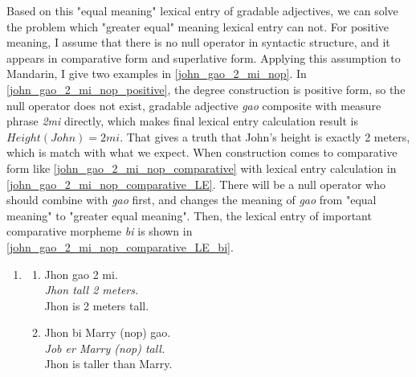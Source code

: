 \documentclass{ctexart}
\begin{document}
Based on this "equal meaning" lexical entry of gradable adjectives, we can solve the problem which "greater equal" meaning lexical entry can not. For positive meaning, I assume that there is no null operator in syntactic structure, and it appears in comparative form and superlative form. Applying this assumption to Mandarin, I give two examples in \ref{john_gao_2_mi_nop}. In \ref{john_gao_2_mi_nop_positive}, the degree construction is positive form, so the null operator does not exist, gradable adjective \textit{gao} composite with measure phrase \textit{2mi} directly, which makes final lexical entry calculation result is $Height(John)=2mi$. That gives a truth that John's height is exactly 2 meters, which is match with what we expect. When construction comes to comparative form like \ref{john_gao_2_mi_nop_comparative} with lexical entry calculation in \ref{john_gao_2_mi_nop_comparative_LE}. There will be a null operator who should combine with \textit{gao} first, and changes the meaning of \textit{gao} from "equal meaning" to "greater equal meaning". Then, the lexical entry of important comparative morpheme \textit{bi} is shown in \ref{john_gao_2_mi_nop_comparative_LE_bi}.

\begin{enumerate}[resume]
    \item \label{john_gao_2_mi_nop}
    
    \begin{enumerate}[ref=(\arabic{enumi}\alph*)]
        \item \label{john_gao_2_mi_nop_positive}
        Jhon gao 2 mi.  \\
        \textit{Jhon tall 2 meters.}    \\
        Jhon is 2 meters tall.

        \item \label{john_gao_2_mi_nop_comparative}
        Jhon bi Marry (nop) gao. \\  
        \textit{Job er Marry (nop) tall.}    \\
        Jhon is taller than Marry.

    \end{enumerate}
    
\end{enumerate}
\end{document}
